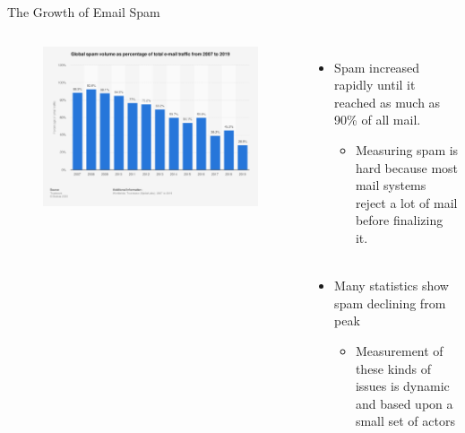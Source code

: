 \documentclass[nobackground,dvipsnames,table,aspectratio=169]{beamer}
\begin{document}
\begin{frame}{The Growth of Email Spam}
    \begin{columns}
            \begin{figure}
                \centering
                \includegraphics[width=\textwidth]{spam-percent}
            \end{figure}
            \begin{itemize}
                \item Spam increased rapidly until it reached as much as 90\% of all mail.
                \begin{itemize}
                    \item Measuring spam is hard because most mail systems reject a lot of mail before finalizing it. \\~\\
                \end{itemize}
                
                \item Many statistics show spam declining from peak
                \begin{itemize}
                    \item Measurement of these kinds of issues is dynamic and based upon a small set of actors
                \end{itemize}
            \end{itemize}
    \end{columns}
\end{frame}
\end{document}
